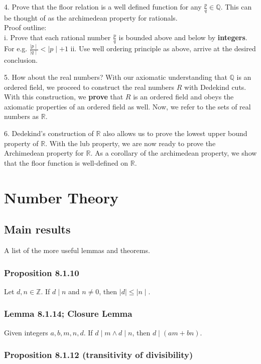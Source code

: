 \documentclass{article}
\begin{document}
4. Prove that the floor relation is a well defined function for any $\frac{p}{q}\in \mathbb{Q}$. This can be thought of as the archimedean property for rationals.\\
Proof outline:\\
i. Prove that each rational number $\frac{p}{q}$ is bounded above and below by \textbf{integers}. For e.g. $\frac{\mid p\mid}{\mid q\mid}<\mid p\mid+1$
ii. Use well ordering principle as above, arrive at the desired conclusion.

5. How about the real numbers? With our axiomatic understanding that $\mathbb{Q}$ is an ordered field, we proceed to construct the real numbers $R$ with Dedekind cuts. With this construction, we \textbf{prove} that $R$ is an ordered field and obeys the axiomatic properties of an ordered field as well. Now, we refer to the sets of real numbers as $\mathbb{R}$.

6. Dedekind's construction of $\mathbb{R}$ also allows us to prove the lowest upper bound property of $\mathbb{R}$. With the lub property, we are now ready to prove the Archimedean property for $\mathbb{R}$. As a corollary of the archimedean property, we show that the floor function is well-defined on $\mathbb{R}$.

\section{Number Theory}
\subsection{Main results}
A list of the more useful lemmas and theorems.
\subsubsection{Proposition 8.1.10}
Let $d, n\in \mathbb{Z}$. If $d\mid n$ and $n\neq 0$, then $\mid d \mid \leq \mid n \mid$.

\subsubsection{Lemma 8.1.14; Closure Lemma}
Given integers $a,b,m,n,d$. If $d\mid m \land d\mid n$, then $d\mid (am+bn)$. 

\subsubsection{Proposition 8.1.12 (transitivity of divisibility)}
\end{document}
